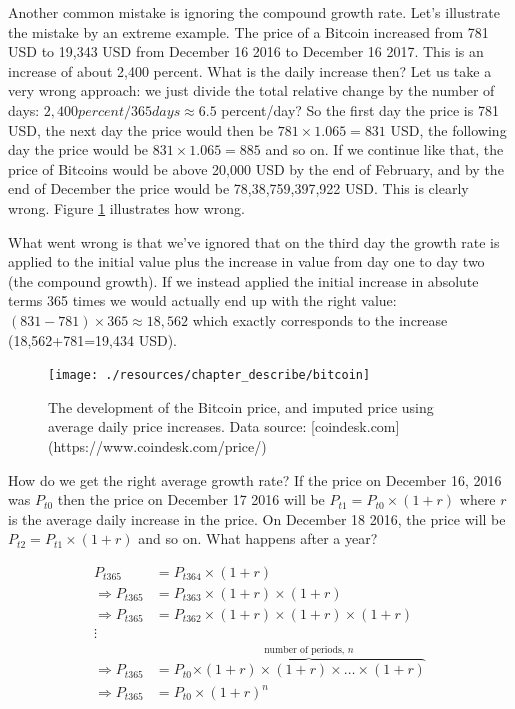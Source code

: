 \documentclass[
]{book}
\begin{document}
Another common mistake is ignoring the compound growth rate. Let's illustrate the mistake by an extreme example. The price of a Bitcoin increased from 781 USD to 19,343 USD from December 16 2016 to December 16 2017. This is an increase of about 2,400 percent. What is the daily increase then? Let us take a very wrong approach: we just divide the total relative change by the number of days: \(2,400percent/365days\approx 6.5\) percent/day? So the first day the price is 781 USD, the next day the price would then be \(781\times1.065=831\) USD, the following day the price would be \(831\times1.065=885\) and so on. If we continue like that, the price of Bitcoins would be above 20,000 USD by the end of February, and by the end of December the price would be 78,38,759,397,922 USD. This is clearly wrong. Figure \ref{fig:desc3} illustrates how wrong.

What went wrong is that we've ignored that on the third day the growth rate is applied to the initial value plus the increase in value from day one to day two (the compound growth). If we instead applied the initial increase in absolute terms 365 times we would actually end up with the right value: \((831-781)\times 365 \approx 18,562\) which exactly corresponds to the increase (18,562+781=19,434 USD).

\begin{figure}

{\centering \texttt{[image: ./resources/chapter\_describe/bitcoin]} 

}

\caption{The development of the Bitcoin price, and imputed price using average daily price increases. Data source: [coindesk.com](https://www.coindesk.com/price/)}\label{fig:desc3}
\end{figure}

How do we get the right average growth rate? If the price on December 16, 2016 was \(P_{t0}\) then the price on December 17 2016 will be \(P_{t1}=P_{t0}\times (1+r)\) where \(r\) is the average daily increase in the price. On December 18 2016, the price will be \(P_{t2}=P_{t1}\times (1+r)\) and so on. What happens after a year?

\begin{align}
  P_{t365}&=P_{t364}\times (1+r)\nonumber\\
  \Rightarrow P_{t365}&=P_{t363}\times (1+r)\times (1+r)\nonumber\\
  \Rightarrow P_{t365}&=P_{t362}\times (1+r)\times (1+r)\times (1+r)\nonumber\\
  \vdots\nonumber\\
  \Rightarrow P_{t365}&=P_{t0}\overbrace{\times(1+r)\times(1+r)\times\dots\times(1+r)}^{\text{number of periods, }n}\nonumber\\
  \Rightarrow P_{t365}&=P_{t0}\times(1+r)^n\nonumber
\end{align}
\end{document}
